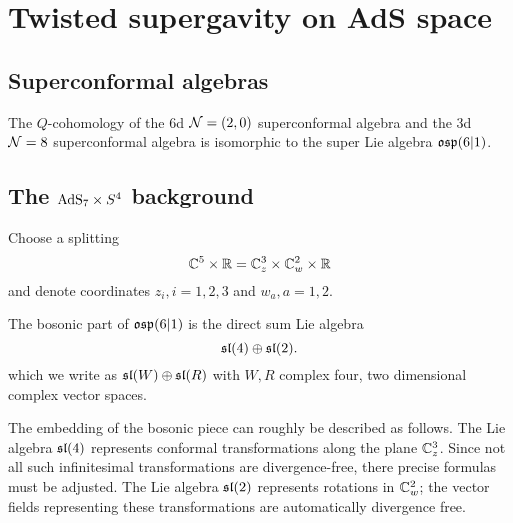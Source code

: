 \documentclass[11pt]{amsart}
\begin{document}
\section{Twisted supergavity on AdS space}

\subsection{Superconformal algebras}

\begin{prop}
The $Q$-cohomology of the 6d $\mathcal N=(2,0)$ superconformal algebra and the 3d $\mathcal N=8$ superconformal algebra is isomorphic to the super Lie algebra $\mathfrak{osp}(6|1)$. 
\end{prop} 


\subsection{The ${\rm AdS}_7 \times S^4$ background}

\parsec[]

Choose a splitting 
\[
\mathbb C^5 \times \mathbb R = \mathbb C_z^3 \times \mathbb C_w^2 \times \mathbb R
\]
and denote coordinates $z_i, i=1,2,3$ and $w_a, a=1,2$.

The bosonic part of $\mathfrak{osp}(6|1)$ is the direct sum Lie algebra
\[
\mathfrak{sl}(4) \oplus \mathfrak{sl}(2) .
\]
which we write as $\mathfrak{sl}(W) \oplus \mathfrak{sl}(R)$ with $W,R$ complex four, two dimensional complex vector spaces. 

The embedding of the bosonic piece can roughly be described as follows. 
The Lie algebra $\mathfrak{sl}(4)$ represents conformal transformations along the plane $\mathbb C^3_z$.
Since not all such infinitesimal transformations are divergence-free, there precise formulas must be adjusted.   
The Lie algebra $\mathfrak{sl}(2)$ represents rotations in $\mathbb C^2_w$; the vector fields representing these transformations are automatically divergence free.
\end{document}
